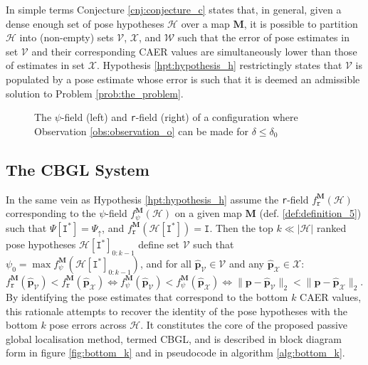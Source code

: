 In simple terms Conjecture \ref{cnj:conjecture_c} states that, in general,
given a dense enough set of pose hypotheses $\mathcal{H}$ over a map $\bm{M}$,
it is possible to partition $\mathcal{H}$ into (non-empty) sets $\mathcal{V}$,
$\mathcal{X}$, and $\mathcal{W}$ such that the error of pose estimates in set
$\mathcal{V}$ and their corresponding CAER values are simultaneously lower than
those of estimates in set $\mathcal{X}$. Hypothesis \ref{hpt:hypothesis_h}
restrictingly states that $\mathcal{V}$ is populated by a pose estimate
whose error is such that it is deemed an admissible solution to
Problem \ref{prob:the_problem}.

\begin{figure}
  
  \vspace{0.7cm}
  \caption{\small The $\psi$-field (left) and \texttt{r}-field (right) of a
           configuration where Observation \ref{obs:observation_o} can be made
           for $\delta \leq \delta_0$}
  \label{fig:h_fig1}
\end{figure}


\subsection{The CBGL System}

In the same vein as Hypothesis \ref{hpt:hypothesis_h} assume the \texttt{r}-field
$f_{\texttt{r}}^{\bm{M}}(\mathcal{H})$ corresponding to the $\psi$-field
$f_{\psi}^{\bm{M}}(\mathcal{H})$ on a given map $\bm{M}$ (def.
\ref{def:definition_5}) such that $\Psi[\texttt{I}^{\ast}] = \Psi_\uparrow$,
and $f_{\texttt{r}}^{\bm{M}}(\mathcal{H}[\texttt{I}^{\ast}]) = \texttt{I}$.
Then the top $k \ll |\mathcal{H}|$ ranked pose hypotheses
$\mathcal{H}[\texttt{I}^{\ast}]_{0:k-1}$ define set $\mathcal{V}$ such that
$\psi_0 = \max f_{\psi}^{\bm{M}}(\mathcal{H}[\texttt{I}^{\ast}]_{0:k-1})$,
and for all $\hat{\bm{p}}_\mathcal{V} \in \mathcal{V}$
and any $\hat{\bm{p}}_{\mathcal{X}} \in \mathcal{X}$:
$ f_{\texttt{r}}^{\bm{M}}(\hat{\bm{p}}_\mathcal{V}) < f_{\texttt{r}}^{\bm{M}}(\hat{\bm{p}}_{\mathcal{X}}) \Leftrightarrow
f_{\psi}^{\bm{M}}(\hat{\bm{p}}_\mathcal{V}) < f_{\psi}^{\bm{M}}(\hat{\bm{p}}_\mathcal{X}) \Leftrightarrow
\|\bm{p}-\hat{\bm{p}}_\mathcal{V}\|_2 < \|\bm{p}-\hat{\bm{p}}_{\mathcal{X}}\|_2$.
By identifying the pose estimates that correspond to the bottom $k$ CAER
values, this rationale attempts to recover the identity of the pose hypotheses
with the bottom $k$ pose errors across $\mathcal{H}$. It constitutes the core
of the proposed passive global localisation method, termed CBGL, and is
described in block diagram form in figure \ref{fig:bottom_k} and in pseudocode
in algorithm \ref{alg:bottom_k}.


